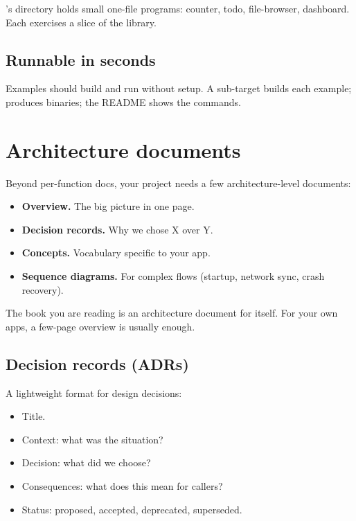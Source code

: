 \maya{}'s  directory holds small one-file
programs: counter, todo, file-browser, dashboard. Each
exercises a slice of the library.

\subsection*{Runnable in seconds}

Examples should build and run without setup. A 
sub-target builds each example;  produces
binaries; the README shows the commands.

\section{Architecture documents}

Beyond per-function docs, your project needs a few
architecture-level documents:

\begin{itemize}[leftmargin=*]
  \item \textbf{Overview.} The big picture in one page.
  \item \textbf{Decision records.} Why we chose X over Y.
  \item \textbf{Concepts.} Vocabulary specific to your app.
  \item \textbf{Sequence diagrams.} For complex flows
    (startup, network sync, crash recovery).
\end{itemize}

The book you are reading is an architecture document for
\maya{} itself. For your own apps, a few-page overview is
usually enough.

\subsection*{Decision records (ADRs)}

A lightweight format for design decisions:

\begin{itemize}[leftmargin=*]
  \item Title.
  \item Context: what was the situation?
  \item Decision: what did we choose?
  \item Consequences: what does this mean for callers?
  \item Status: proposed, accepted, deprecated, superseded.
\end{itemize}

